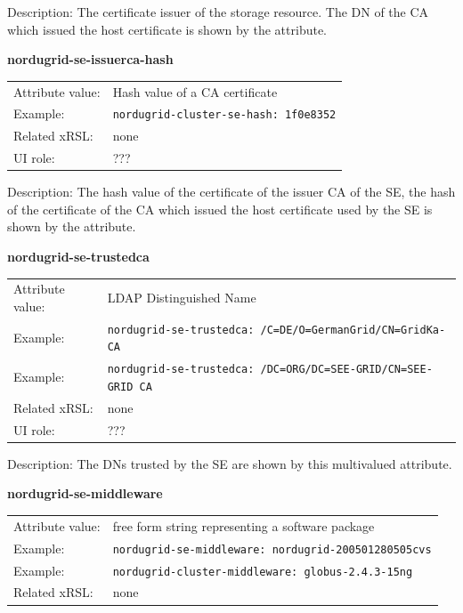 \documentclass{article}
\begin{document}
Description: 
The certificate issuer of the storage resource.
The DN of the CA which issued the host certificate is shown by the attribute.


  \hspace*{0.5cm}
  \begin{shaded}
    \textbf{nordugrid-se-issuerca-hash}
  \end{shaded}
  \begin{tabular}{lp{10cm}}  
    Attribute value:& Hash value of a CA certificate\\
    Example:& \verb#nordugrid-cluster-se-hash: 1f0e8352#\\
    Related xRSL:& none\\
    UI role:& ???\\
  \end{tabular}

Description: The hash value of the certificate of the issuer CA of the SE, 
the hash of the certificate of the CA which issued the host certificate 
used by the SE is shown by the attribute.


  \hspace*{0.5cm}
  \begin{shaded}
    \textbf{nordugrid-se-trustedca}
  \end{shaded}
  \begin{tabular}{lp{10cm}}  
    Attribute value:& LDAP Distinguished Name\\
    Example:& \verb#nordugrid-se-trustedca: /C=DE/O=GermanGrid/CN=GridKa-CA#\\
    Example:& \verb#nordugrid-se-trustedca: /DC=ORG/DC=SEE-GRID/CN=SEE-GRID CA#\\
    Related xRSL:& none\\
    UI role:& ???\\
  \end{tabular}

Description: The DNs trusted by the SE are shown by this
multivalued attribute.


  \hspace*{0.5cm}
  \begin{shaded}
    \textbf{nordugrid-se-middleware}
  \end{shaded}
  \begin{tabular}{lp{10cm}}  
    Attribute value:& free form string representing a software package\\
    Example:& \verb#nordugrid-se-middleware: nordugrid-200501280505cvs#\\
    Example:& \verb#nordugrid-cluster-middleware: globus-2.4.3-15ng#\\
    Related xRSL:& none\\
  \end{tabular}
\end{document}
